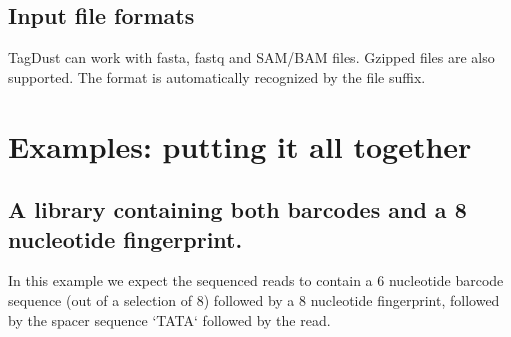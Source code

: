 \documentclass[11pt,a4paper,oneside]{book}
\begin{document}
\subsection{Input file formats}

TagDust can work with fasta, fastq and SAM/BAM files. Gzipped files are also supported. The format is automatically recognized by the file suffix. %
 




%
 

\section{Examples: putting it all together}


\subsection{A library containing both barcodes and a 8 nucleotide fingerprint.}

In this example we expect the sequenced reads to contain a 6 nucleotide barcode sequence (out of a selection of 8) followed by a 8 nucleotide fingerprint, followed by the spacer sequence `TATA` followed by the read. \\
\end{document}
